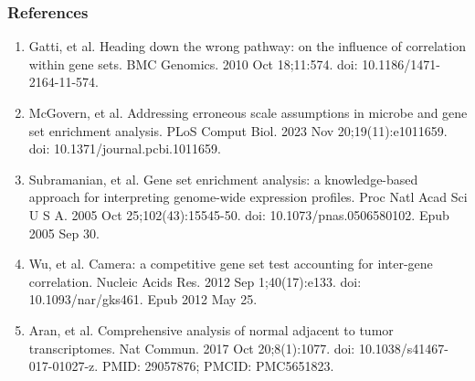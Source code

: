 \documentclass[11pt]{beamer}
\begin{document}
\begin{frame}
  \frametitle{References}

  \begin{enumerate}   
  \item \footnotesize{Gatti, et al. Heading down the wrong pathway: on the influence of correlation within gene sets. BMC Genomics. 2010 Oct 18;11:574. doi: 10.1186/1471-2164-11-574.}
  \item \footnotesize{McGovern, et al. Addressing erroneous scale assumptions in microbe and gene set enrichment analysis. PLoS Comput Biol. 2023 Nov 20;19(11):e1011659. doi: 10.1371/journal.pcbi.1011659.}
   \item \footnotesize{Subramanian, et al. Gene set enrichment analysis: a knowledge-based approach for interpreting genome-wide expression profiles. Proc Natl Acad Sci U S A. 2005 Oct 25;102(43):15545-50. doi: 10.1073/pnas.0506580102. Epub 2005 Sep 30.}
   \item \footnotesize{Wu, et al. Camera: a competitive gene set test accounting for inter-gene correlation. Nucleic Acids Res. 2012 Sep 1;40(17):e133. doi: 10.1093/nar/gks461. Epub 2012 May 25.}
     \item \footnotesize{Aran, et al. Comprehensive analysis of normal adjacent to tumor transcriptomes. Nat Commun. 2017 Oct 20;8(1):1077. doi: 10.1038/s41467-017-01027-z. PMID: 29057876; PMCID: PMC5651823.}
  \end{enumerate}
  
\end{frame}
\end{document}
